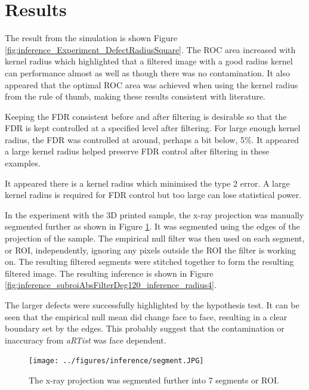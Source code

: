 \documentclass{proc}
\begin{document}
\section{Results}

The result from the simulation is shown Figure \ref{fig:inference_Experiment_DefectRadiusSquare}. The ROC area increased with kernel radius which highlighted that a filtered image with a good radius kernel can performance almost as well as though there was no contamination. It also appeared that the optimal ROC area was achieved when using the kernel radius from the rule of thumb, making these results consistent with literature.

Keeping the FDR consistent before and after filtering is desirable so that the FDR is kept controlled at a specified level after filtering. For large enough kernel radius, the FDR was controlled at around, perhaps a bit below, 5\%. It appeared a large kernel radius helped preserve FDR control after filtering in these examples. 

It appeared there is a kernel radius which minimised the type 2 error. A large kernel radius is required for FDR control but too large can lose statistical power.

In the experiment with the 3D printed sample, the x-ray projection was manually segmented further as shown in Figure \ref{fig:inference_segmentFurther}. It was segmented using the edges of the projection of the sample. The empirical null filter was then used on each segment, or ROI, independently, ignoring any pixels outside the ROI the filter is working on. The resulting filtered segments were stitched together to form the resulting filtered image. The resulting inference is shown in Figure \ref{fig:inference_subroiAbsFilterDeg120_inference_radius4}.

The larger defects were successfully highlighted by the hypothesis test. It can be seen that the empirical null mean did change face to face, resulting in a clear boundary set by the edges. This probably suggest that the contamination or inaccuracy from \emph{aRTist} was face dependent.

\begin{figure}
  \centering
  \texttt{[image: ../figures/inference/segment.JPG]}
  \caption{The x-ray projection was segmented further into 7 segments or ROI.}
  \label{fig:inference_segmentFurther}
\end{figure}
\end{document}
